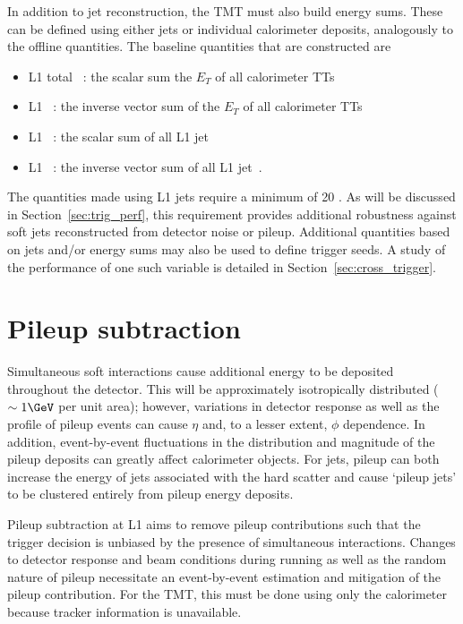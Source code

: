 In addition to jet reconstruction, the TMT must also build energy sums. 
These can be defined using either jets or individual calorimeter deposits, analogously to
the offline quantities. The baseline quantities that are constructed are

\begin{itemize}
\item L1 total \Et~: the scalar sum the $E_T$ of all calorimeter TTs
\item L1 \met~: the inverse vector sum of the $E_T$ of all calorimeter TTs
\item L1 \scalht~: the scalar sum of all L1 jet~\pt
\item L1 \mht~: the inverse vector sum of all L1 jet~\pt.
\end{itemize}

The quantities made using L1 jets require a minimum \pt of 20 \GeV. As will be discussed in 
Section~\ref{sec:trig_perf}, this requirement provides additional robustness against soft
jets reconstructed from detector noise or pileup. Additional quantities based 
on jets and/or energy sums may also be used to define trigger seeds. 
A study of the performance of one such variable is detailed in Section~\ref{sec:cross_trigger}.

\section{Pileup subtraction}
\label{sec:pileup_algo}
Simultaneous soft interactions cause additional energy to be deposited throughout
the detector. This will be approximately isotropically distributed ($\sim1 \GeV$ per unit area); however, variations
in detector response as well as the profile of pileup events can cause $\eta$ and,
to a lesser extent, $\phi$ dependence. In addition, event-by-event fluctuations in the distribution 
and magnitude of the pileup deposits can greatly affect calorimeter objects. 
For jets, pileup can both increase the energy of jets associated with the hard 
scatter and cause `pileup jets' to be clustered 
entirely from pileup energy deposits.

Pileup subtraction at L1 aims to remove pileup contributions such that the trigger
decision is unbiased by the presence of simultaneous interactions. Changes to detector response and beam conditions during running
as well as the random nature of pileup necessitate an event-by-event
estimation and mitigation of the pileup contribution. For the TMT, this must be done using only the calorimeter because
tracker information is unavailable. 

